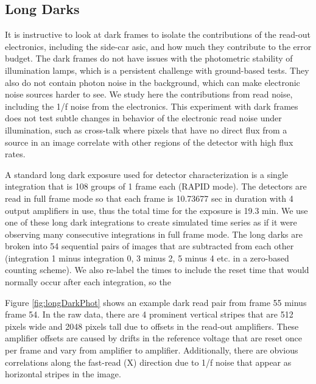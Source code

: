 \documentclass[]{aastex62}
\begin{document}
\subsection{Long Darks}\label{sec:longDarks}

It is instructive to look at dark frames to isolate the contributions of the read-out electronics, including the side-car asic, and how much they contribute to the error budget.
The dark frames do not have issues with the photometric stability of illumination lamps, which is a persistent challenge with ground-based tests.
They also do not contain photon noise in the background, which can make electronic noise sources harder to see.
We study here the contributions from read noise, including the 1/f noise from the electronics.
This experiment with dark frames does not test subtle changes in behavior of the electronic read noise under illumination, such as cross-talk where pixels that have no direct flux from a source in an image correlate with other regions of the detector with high flux rates.

A standard long dark exposure used for detector characterization is a single integration that is 108 groups of 1 frame each (RAPID mode).
The detectors are read in full frame mode so that each frame is 10.73677 sec in duration with 4 output amplifiers in use, thus the total time for the exposure is 19.3 min.
We use one of these long dark integrations to create simulated time series as if it were observing many consecutive integrations in full frame mode.
The long darks are broken into 54 sequential pairs of images that are subtracted from each other (integration 1 minus integration 0, 3 minus 2, 5 minus 4 etc. in a zero-based counting scheme).
We also re-label the times to include the reset time that would normally occur after each integration, so the 

Figure \ref{fig:longDarkPhot} shows an example dark read pair from frame 55 minus frame 54.
In the raw data, there are 4 prominent vertical stripes that are 512 pixels wide and 2048 pixels tall due to offsets in the read-out amplifiers.
These amplifier offsets are caused by drifts in the reference voltage that are reset once per frame and vary from amplifier to amplifier.
Additionally, there are obvious correlations along the fast-read (X) direction due to 1/f noise that appear as horizontal stripes in the image.
\end{document}
